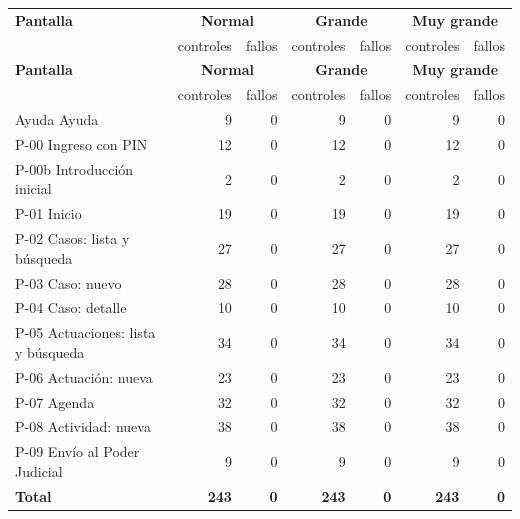 \small
\setlength{\tabcolsep}{4pt}
\begin{longtable}{@{}p{5.4cm}rrrrrr@{}}
\toprule
\textbf{Pantalla} & \multicolumn{2}{c}{\textbf{Normal}} & \multicolumn{2}{c}{\textbf{Grande}} & \multicolumn{2}{c}{\textbf{Muy grande}} \\
 & controles & fallos & controles & fallos & controles & fallos \\
\midrule
\endfirsthead
\toprule
\textbf{Pantalla} & \multicolumn{2}{c}{\textbf{Normal}} & \multicolumn{2}{c}{\textbf{Grande}} & \multicolumn{2}{c}{\textbf{Muy grande}} \\
 & controles & fallos & controles & fallos & controles & fallos \\
\midrule
\endhead
\bottomrule
\endfoot
Ayuda Ayuda & 9 & 0 & 9 & 0 & 9 & 0 \\
P-00 Ingreso con PIN & 12 & 0 & 12 & 0 & 12 & 0 \\
P-00b Introducción inicial & 2 & 0 & 2 & 0 & 2 & 0 \\
P-01 Inicio & 19 & 0 & 19 & 0 & 19 & 0 \\
P-02 Casos: lista y búsqueda & 27 & 0 & 27 & 0 & 27 & 0 \\
P-03 Caso: nuevo & 28 & 0 & 28 & 0 & 28 & 0 \\
P-04 Caso: detalle & 10 & 0 & 10 & 0 & 10 & 0 \\
P-05 Actuaciones: lista y búsqueda & 34 & 0 & 34 & 0 & 34 & 0 \\
P-06 Actuación: nueva & 23 & 0 & 23 & 0 & 23 & 0 \\
P-07 Agenda & 32 & 0 & 32 & 0 & 32 & 0 \\
P-08 Actividad: nueva & 38 & 0 & 38 & 0 & 38 & 0 \\
P-09 Envío al Poder Judicial & 9 & 0 & 9 & 0 & 9 & 0 \\
\midrule
\textbf{Total} & \textbf{243} & \textbf{0} & \textbf{243} & \textbf{0} & \textbf{243} & \textbf{0} \\
\end{longtable}